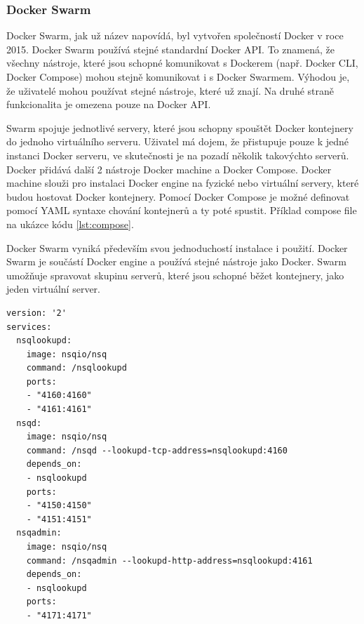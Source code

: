  \subsubsection{Docker Swarm}
 Docker Swarm, jak už název napovídá, byl vytvořen společností Docker v roce 2015. Docker Swarm používá stejné standardní Docker API. To znamená, že všechny nástroje, které jsou schopné komunikovat s Dockerem (např. Docker CLI, Docker Compose) mohou stejně komunikovat i s Docker Swarmem. Výhodou je, že uživatelé mohou používat stejné nástroje, které už znají. Na druhé straně funkcionalita je omezena pouze na Docker API. \par
     Swarm spojuje jednotlivé servery, které jsou schopny spouštět Docker kontejnery do jednoho virtuálního serveru. Uživatel má dojem, že přistupuje pouze k jedné instanci Docker serveru, ve skutečnosti je na pozadí několik takovýchto serverů. Docker přidává další 2 nástroje Docker machine a Docker Compose. Docker machine slouži pro instalaci Docker engine na fyzické nebo virtuální servery, které budou hostovat Docker kontejnery. Pomocí Docker Compose je možné definovat pomocí YAML syntaxe chování kontejnerů a ty poté spustit. Příklad compose file na ukázce kódu \ref{lst:compose}.\par
         Docker Swarm vyniká především svou jednoduchostí instalace i použití. Docker Swarm je součástí Docker engine a používá stejné nástroje jako Docker. Swarm \linebreak umožňuje spravovat skupinu serverů, které jsou schopné běžet kontejnery, jako jeden virtuální server.

\begin{lstlisting}[caption={Příklad Docker compose souboru},label=lst:compose]
version: '2'
services:
  nsqlookupd:
    image: nsqio/nsq
    command: /nsqlookupd
    ports:
    - "4160:4160"
    - "4161:4161"
  nsqd:
    image: nsqio/nsq
    command: /nsqd --lookupd-tcp-address=nsqlookupd:4160
    depends_on:
    - nsqlookupd
    ports:
    - "4150:4150"
    - "4151:4151"
  nsqadmin:
    image: nsqio/nsq
    command: /nsqadmin --lookupd-http-address=nsqlookupd:4161
    depends_on:
    - nsqlookupd  
    ports:
    - "4171:4171"
\end{lstlisting}

